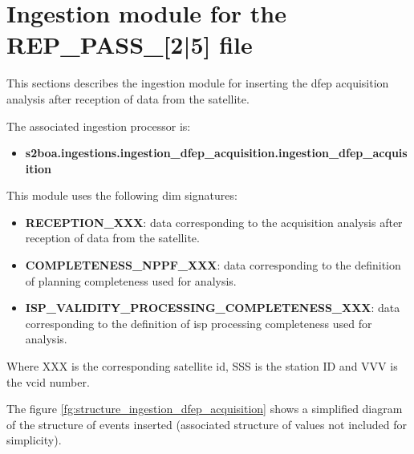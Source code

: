 \section{Ingestion module for the REP\_PASS\_[2|5] file}

This sections describes the ingestion module for inserting the \acrshort{dfep} acquisition analysis after reception of data from the satellite.

The associated ingestion processor is:

\begin{itemize} 

\item \textbf{s2boa.ingestions.ingestion\_dfep\_acquisition.ingestion\_dfep\_acquisition}
  
\end{itemize}

This module uses the following \acrshort{dim} signatures:

\begin{itemize} 

\item \textbf{RECEPTION\_XXX}: data corresponding to the acquisition analysis after reception of data from the satellite.

\item \textbf{COMPLETENESS\_NPPF\_XXX}: data corresponding to the definition of planning completeness used for analysis.

\item \textbf{ISP\_VALIDITY\_PROCESSING\_COMPLETENESS\_XXX}: data corresponding to the definition of \acrshort{isp} processing completeness used for analysis.

\end{itemize}

Where XXX is the corresponding satellite id, SSS is the station ID and VVV is the \acrshort{vcid} number.

The figure \ref{fg:structure_ingestion_dfep_acquisition} shows a simplified diagram of the structure of events inserted (associated structure of values not included for simplicity).

